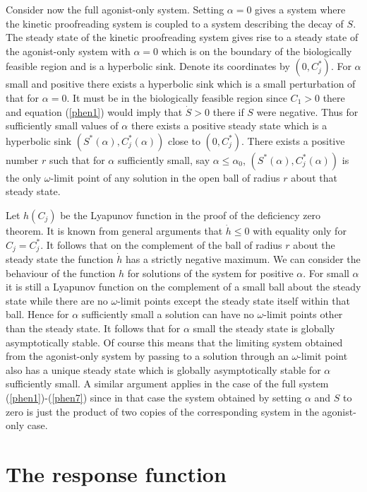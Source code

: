 \documentclass{article}
\begin{document}
Consider now the full agonist-only system. Setting $\alpha=0$ gives a system 
where the kinetic proofreading system is coupled to a system describing the 
decay of $S$. The steady state of the kinetic proofreading system gives rise to 
a steady state of the agonist-only system with $\alpha=0$ which is on 
the boundary of the biologically feasible region and is a hyperbolic sink. 
Denote its coordinates by $(0,C_j^*)$. For $\alpha$ small and positive there 
exists a hyperbolic sink which is a small perturbation of that for $\alpha=0$. 
It must be in the biologically feasible region since $C_1>0$ there and 
equation (\ref{phen1}) would imply that $\dot S>0$ there if $S$ were negative.  
Thus for sufficiently small values of $\alpha$ there exists a 
positive steady state which is a hyperbolic sink 
$(S^*(\alpha),C_j^*(\alpha))$ close to $(0,C_j^*)$. There exists a 
positive number $r$ such that for $\alpha$ sufficiently small, say 
$\alpha\le\alpha_0$, $(S^*(\alpha),C_j^*(\alpha))$ is the only $\omega$-limit 
point of any solution in the open ball of radius $r$ about that steady 
state. 

Let $h(C_j)$ be the Lyapunov function in the proof of the deficiency 
zero theorem. It is known from general arguments that $\dot h\le 0$ with 
equality only for $C_j=C_j^*$. It follows that on the complement of the ball 
of radius $r$ about the steady state the function $\dot h$ has a
strictly negative maximum. We can consider the behaviour of the function $h$ 
for solutions of the system for positive $\alpha$. For
small $\alpha$ it is still a Lyapunov function on the complement of a small
ball about the steady state while there are no $\omega$-limit points 
except the steady state itself within that ball. Hence for $\alpha$ 
sufficiently small a solution can have no $\omega$-limit points other than 
the steady state. It follows that for $\alpha$ small the steady state 
is globally asymptotically stable. Of course this means that the 
limiting system obtained from the agonist-only system by passing to a solution
through an $\omega$-limit point also has a unique steady state which is 
globally asymptotically stable for $\alpha$ sufficiently small. A similar
argument applies in the case of the full system (\ref{phen1})-(\ref{phen7})
since in that case the system obtained by setting $\alpha$ and $S$ to zero 
is just the product of two copies of the corresponding system in the 
agonist-only case.

\section{The response function}\label{response}
\end{document}
